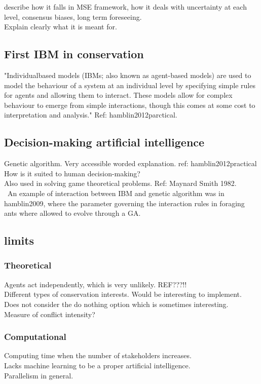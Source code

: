 \documentclass[12pt,a4paper]{article}
\begin{document}
describe how it falls in MSE framework, how it deals with uncertainty at each level, consensus biases, long term foreseeing.\\
Explain clearly what it is meant for.

\subsection{First IBM in conservation}

"Individualbased
models (IBMs; also known as agent-based models) are
used to model the behaviour of a system at an individual level
by specifying simple rules for agents and allowing them to
interact. These models allow for complex behaviour to emerge
from simple interactions, though this comes at some cost to
interpretation and analysis." Ref: hamblin2012parctical.

\subsection{Decision-making artificial intelligence}

Genetic algorithm. Very accessible worded explanation. ref: hamblin2012practical\\
How is it suited to human decision-making?\\
Also used in solving game theoretical problems. Ref: Maynard Smith 1982.\\\
An example of interaction between IBM and genetic algorithm was in hamblin2009, where the parameter governing the interaction rules in foraging ants where allowed to evolve through a GA. 

\subsection{limits}

\subsubsection{Theoretical}

Agents act independently, which is very unlikely. REF???!!\\
Different types of conservation interests.
Would be interesting to implement.\\
Does not consider the do nothing option which is sometimes interesting.\\
Measure of conflict intensity?

\subsubsection{Computational}
Computing time when the number of stakeholders increases.\\
Lacks machine learning to be a proper artificial intelligence.\\
Parallelism in general.
\end{document}
